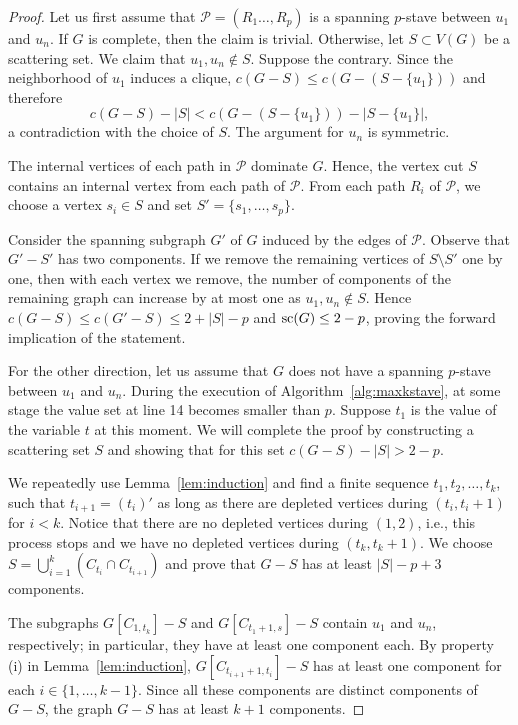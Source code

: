 \documentclass{llncs}
\DeclareMathOperator{\scat}{{\rm sc}}
\newcommand{\cP}{{\mathcal P}}
\begin{document}
\begin{proof}
Let us first assume that $\cP=(R_1\dots,R_p)$ is a spanning $p$-stave between $u_1$ and $u_n$. If $G$ is complete, then the claim is trivial. Otherwise, let $S\subset V(G)$ be a scattering set. We claim that $u_1,u_n\notin S$. Suppose the contrary. Since the neighborhood of $u_1$ induces a clique, $c(G-S) \leq c(G-(S-\{u_1\}))$ and therefore 
\begin{equation*}
c(G-S)-|S| < c(G-(S-\{u_1\})) - |S-\{u_1\}|,
\end{equation*}
a contradiction with the choice of $S$. The argument for $u_n$ is symmetric.

The internal vertices of each path in $\cP$ dominate $G$. Hence, 
the vertex cut $S$ contains an internal vertex from each path of $\cP$. From each path $R_i$ of $\cP$, we choose a vertex $s_i \in S$ and set $S' = \{s_1,\dots,s_p\}$. 

Consider the spanning subgraph $G'$ of $G$ induced by the edges of $\cP$.
Observe that $G'-S'$ has two components. If we remove the remaining vertices of
$S\setminus S'$ one by one, then with each vertex we remove, 
the number of components of the remaining graph can increase by at most one as $u_1,u_n\notin S$.
Hence $c(G-S)\le c(G'-S)\le 2+|S|-p$ and 
$\scat(G)\le 2-p$, proving
the forward implication of the statement.
 
For the other direction, let us assume that $G$ does not have a spanning $p$-stave between $u_1$ and $u_n$. During the execution of Algorithm~\ref{alg:maxkstave}, at some stage the value set at line 14 becomes smaller than $p$. 
Suppose $t_1$ is the value of the variable $t$ at this moment.
We will complete the proof by constructing a scattering set $S$ and showing that for this set $c(G-S)-|S|> 2-p$.

We repeatedly use Lemma~\ref{lem:induction} and find a finite sequence 
$t_1,t_2,\dots,t_k$, such that $t_{i+1}=(t_i)'$ as long as there are depleted vertices during $(t_i,t_i+1)$ for $i<k$.
Notice that there are no depleted vertices during $(1,2)$, i.e., this process stops and we have no depleted vertices during $(t_k,t_k+1)$.
We choose $S=\bigcup_{i=1}^k (C_{t_i}\cap C_{t_{i+1}})$ and prove  
that $G-S$ has at least $|S|-p+3$ components.

The subgraphs $G[C_{1,t_k}]-S$ and $G[C_{t_1+1,s}]-S$ contain $u_1$ and $u_n$, respectively; in particular, they have at least one component each. By property (i) in Lemma~\ref{lem:induction}, $G[C_{t_{i+1}+1,t_i}]-S$ has at least one component for each $i\in\{1,\ldots,k-1\}$. 
Since all these components are distinct components of $G-S$, the graph $G-S$ has at least $k+1$ components.


\end{proof}
\end{document}

